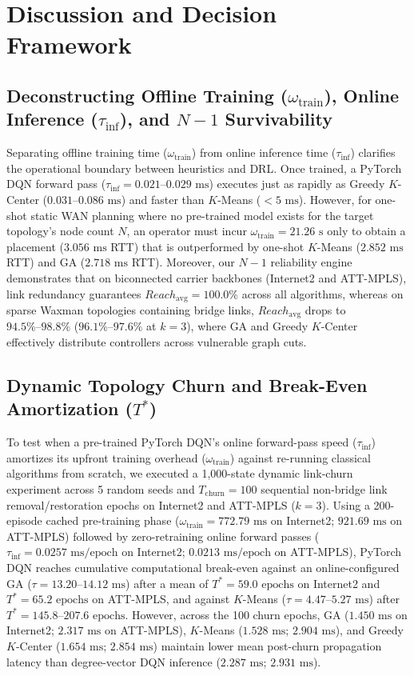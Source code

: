 \documentclass[conference]{IEEEtran}
\begin{document}
\section{Discussion and Decision Framework}

\subsection{Deconstructing Offline Training ($\omega_{\text{train}}$), Online Inference ($\tau_{\text{inf}}$), and $N-1$ Survivability}
Separating offline training time ($\omega_{\text{train}}$) from online inference time ($\tau_{\text{inf}}$) clarifies the operational boundary between heuristics and DRL. Once trained, a PyTorch DQN forward pass ($\tau_{\text{inf}} = 0.021\text{--}0.029\text{ ms}$) executes just as rapidly as Greedy $K$-Center ($0.031\text{--}0.086\text{ ms}$) and faster than $K$-Means ($< 5\text{ ms}$). However, for one-shot static WAN planning where no pre-trained model exists for the target topology's node count $N$, an operator must incur $\omega_{\text{train}} = 21.26\text{ s}$ only to obtain a placement ($3.056\text{ ms}$ RTT) that is outperformed by one-shot $K$-Means ($2.852\text{ ms}$ RTT) and GA ($2.718\text{ ms}$ RTT). Moreover, our $N-1$ reliability engine demonstrates that on biconnected carrier backbones (Internet2 and ATT-MPLS), link redundancy guarantees $Reach_{\text{avg}} = 100.0\%$ across all algorithms, whereas on sparse Waxman topologies containing bridge links, $Reach_{\text{avg}}$ drops to $94.5\%\text{--}98.8\%$ ($96.1\%\text{--}97.6\%$ at $k=3$), where GA and Greedy $K$-Center effectively distribute controllers across vulnerable graph cuts.

\subsection{Dynamic Topology Churn and Break-Even Amortization ($T^*$)}
To test when a pre-trained PyTorch DQN's online forward-pass speed ($\tau_{\text{inf}}$) amortizes its upfront training overhead ($\omega_{\text{train}}$) against re-running classical algorithms from scratch, we executed a 1,000-state dynamic link-churn experiment across 5 random seeds and $T_{\text{churn}} = 100$ sequential non-bridge link removal/restoration epochs on Internet2 and ATT-MPLS ($k=3$). Using a 200-episode cached pre-training phase ($\omega_{\text{train}} = 772.79\text{ ms}$ on Internet2; $921.69\text{ ms}$ on ATT-MPLS) followed by zero-retraining online forward passes ($\tau_{\text{inf}} = 0.0257\text{ ms/epoch}$ on Internet2; $0.0213\text{ ms/epoch}$ on ATT-MPLS), PyTorch DQN reaches cumulative computational break-even against an online-configured GA ($\tau = 13.20\text{--}14.12\text{ ms}$) after a mean of $T^* = 59.0\text{ epochs}$ on Internet2 and $T^* = 65.2\text{ epochs}$ on ATT-MPLS, and against $K$-Means ($\tau = 4.47\text{--}5.27\text{ ms}$) after $T^* = 145.8\text{--}207.6\text{ epochs}$. However, across the 100 churn epochs, GA ($1.450\text{ ms}$ on Internet2; $2.317\text{ ms}$ on ATT-MPLS), $K$-Means ($1.528\text{ ms}$; $2.904\text{ ms}$), and Greedy $K$-Center ($1.654\text{ ms}$; $2.854\text{ ms}$) maintain lower mean post-churn propagation latency than degree-vector DQN inference ($2.287\text{ ms}$; $2.931\text{ ms}$).
\end{document}
